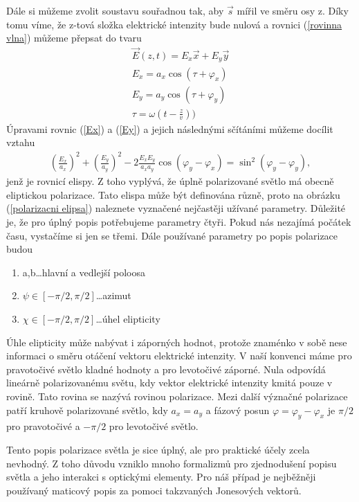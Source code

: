 Dále si můžeme zvolit soustavu souřadnou tak, aby $\vec{s}$ mířil ve směru osy z. Díky tomu víme, že z-tová složka elektrické intenzity bude nulová a rovnici (\ref{rovinna vlna}) můžeme  přepsat do tvaru
\begin{eqnarray}
\vec{E}(z,t)=E_x\vec{x}+E_y\vec{y} \\
E_x=a_x\cos(\tau+\varphi_x) \label{Ex}\\
E_y=a_y\cos(\tau+\varphi_y) \label{Ey}\\
\tau=\omega(t-\frac{z}{v}))
\end{eqnarray}
Úpravami rovnic (\ref{Ex}) a (\ref{Ey}) a jejich následnými sčítáními můžeme docílit vztahu
\begin{eqnarray}
\left(\frac{E_x}{a_x}\right)^2+\left(\frac{E_y}{a_y}\right)^2-2\frac{E_xE_y}{a_xa_y}\cos(\varphi_y-\varphi_x)=\sin^2(\varphi_y-\varphi_y),
\end{eqnarray}
jenž je rovnicí elispy. Z toho vyplývá, že úplně polarizované světlo má obecně eliptickou polarizace. Tato elispa může být definována různě, proto na obrázku (\ref{polarizacni elipsa}) naleznete vyznačené nejčastěji užívané parametry. Důležité je, že pro úplný popis potřebujeme parametry čtyři. Pokud nás nezajímá počátek času, vystačíme si jen se třemi. Dále používané parametry po popis polarizace budou
\begin{enumerate}
\item a,b\dots hlavní a vedlejší poloosa
\item $\psi\in[-\pi/2,\pi/2]$\dots azimut
\item $\chi\in[-\pi/2,\pi/2]$\dots úhel elipticity
\end{enumerate}
Úhle elipticity může nabývat i záporných hodnot, protože znaménko v sobě nese informaci o směru otáčení vektoru elektrické intenzity. V naší konvenci máme pro pravotočivé světlo kladné hodnoty a pro levotočivé záporné. Nula odpovídá lineárně polarizovanému světu, kdy vektor elektrické intenzity kmitá pouze v rovině. Tato rovina se nazývá rovinou polarizace. Mezi další význačné polarizace patří kruhově polarizované světlo, kdy $a_x=a_y$ a fázový posun $\varphi=\varphi_y-\varphi_x$ je $\pi/2$ pro pravotočivé a $-\pi/2$ pro levotočivé světlo.

Tento popis polarizace světla je sice úplný, ale pro praktické účely zcela nevhodný. Z toho důvodu vzniklo mnoho formalizmů pro zjednodušení popisu světla a jeho interakci s optickými elementy. Pro náš případ je nejběžněji používaný maticový popis za pomoci takzvaných Jonesových vektorů.

